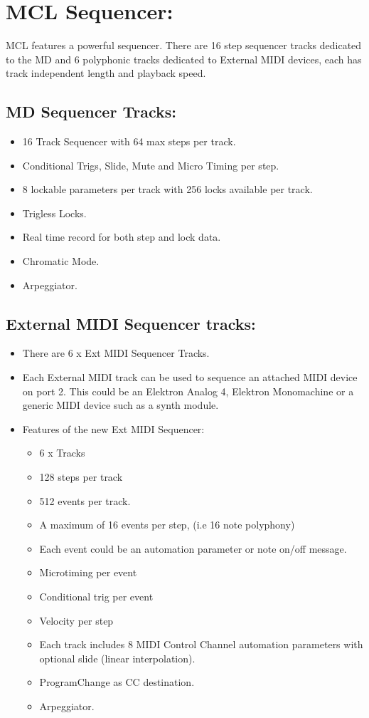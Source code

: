 \chapter{MCL Sequencer:}
MCL features a powerful sequencer. There are 16 step sequencer tracks dedicated to the MD and 6 polyphonic tracks dedicated to External MIDI devices, each has track independent length and playback speed.
\section{MD Sequencer Tracks:}
\begin{itemize}
\item 16 Track Sequencer with 64 max steps per track.
\item Conditional Trigs, Slide, Mute and Micro Timing per step.
\item 8 lockable parameters per track with 256 locks available per track.
\item Trigless Locks.
\item Real time record for both step and lock data.
\item Chromatic Mode.
\item Arpeggiator.
\end{itemize}
\section{External MIDI Sequencer tracks:}
\begin{itemize}
\item There are 6 x Ext MIDI Sequencer Tracks.
\item Each External MIDI track can be used to sequence an attached MIDI device on port 2. This could be an Elektron Analog 4, Elektron Monomachine or a generic MIDI device such as a synth module.
\item
    Features of the new Ext MIDI Sequencer:
\begin{itemize}
    \item 6 x Tracks
    \item 128 steps per track
	\item 512 events per track.
    \item A maximum of 16 events per step, (i.e 16 note polyphony)
	\item Each event could be an automation parameter or note on/off message.
    \item Microtiming per event
    \item Conditional trig per event
    \item Velocity per step
    \item Each track includes 8 MIDI Control Channel automation parameters with optional slide (linear interpolation).
    \item ProgramChange as CC destination.
    \item Arpeggiator.
\end{itemize}
\end{itemize}

